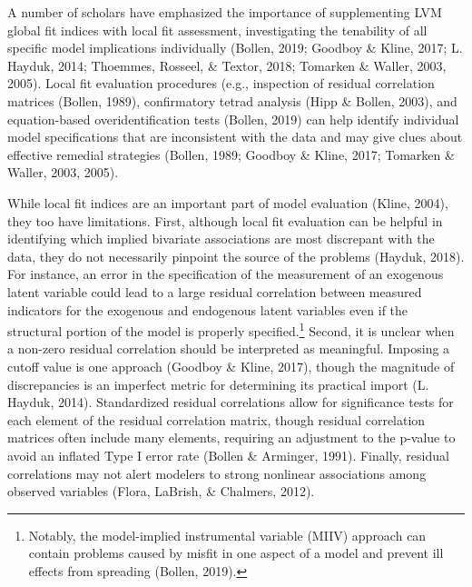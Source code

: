 \documentclass[
  english,
  doc]{apa6}
\begin{document}
A number of scholars have emphasized the importance of supplementing LVM global fit indices with local fit assessment, investigating the tenability of all specific model implications individually (Bollen, 2019; Goodboy \& Kline, 2017; L. Hayduk, 2014; Thoemmes, Rosseel, \& Textor, 2018; Tomarken \& Waller, 2003, 2005). Local fit evaluation procedures (e.g., inspection of residual correlation matrices (Bollen, 1989), confirmatory tetrad analysis (Hipp \& Bollen, 2003), and equation-based overidentification tests (Bollen, 2019) can help identify individual model specifications that are inconsistent with the data and may give clues about effective remedial strategies (Bollen, 1989; Goodboy \& Kline, 2017; Tomarken \& Waller, 2003, 2005).

While local fit indices are an important part of model evaluation (Kline, 2004), they too have limitations. First, although local fit evaluation can be helpful in identifying which implied bivariate associations are most discrepant with the data, they do not necessarily pinpoint the source of the problems (Hayduk, 2018). For instance, an error in the specification of the measurement of an exogenous latent variable could lead to a large residual correlation between measured indicators for the exogenous and endogenous latent variables even if the structural portion of the model is properly specified.\footnote{Notably, the model-implied instrumental variable (MIIV) approach can contain problems caused by misfit in one aspect of a model and prevent ill effects from spreading (Bollen, 2019).} Second, it is unclear when a non-zero residual correlation should be interpreted as meaningful. Imposing a cutoff value is one approach (Goodboy \& Kline, 2017), though the magnitude of discrepancies is an imperfect metric for determining its practical import (L. Hayduk, 2014). Standardized residual correlations allow for significance tests for each element of the residual correlation matrix, though residual correlation matrices often include many elements, requiring an adjustment to the p-value to avoid an inflated Type I error rate (Bollen \& Arminger, 1991). Finally, residual correlations may not alert modelers to strong nonlinear associations among observed variables (Flora, LaBrish, \& Chalmers, 2012).
\end{document}
